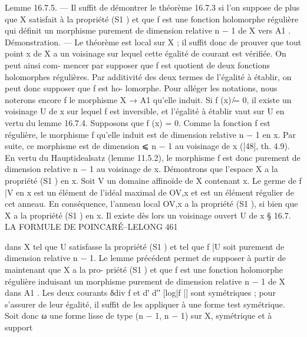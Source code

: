 \documentclass[
  10pt,
]{article}
\newenvironment{Shaded}{}{}
\newcommand{\NormalTok}[1]{#1}
\begin{document}
\begin{Shaded}
\begin{Highlighting}[]
\NormalTok{Lemme 16.7.5. — Il suffit de démontrer le théorème 16.7.3 si l’on suppose de plus que}
\NormalTok{X satisfait à la propriété (S1 ) et que f est une fonction holomorphe régulière qui définit}
\NormalTok{un morphisme purement de dimension relative n − 1 de X vers A1 .}
\NormalTok{Démonstration. — Le théorème est local sur X ; il suffit donc de prouver que tout point x}
\NormalTok{de X a un voisinage sur lequel cette égalité de courant est vérifiée. On peut ainsi com{-}}
\NormalTok{mencer par supposer que f est quotient de deux fonctions holomorphes régulières. Par}
\NormalTok{additivité des deux termes de l’égalité à établir, on peut donc supposer que f est ho{-}}
\NormalTok{lomorphe. Pour alléger les notations, nous noterons encore f le morphisme X → A1}
\NormalTok{qu’elle induit.}
\NormalTok{   Si f (x) ̸= 0, il existe un voisinage U de x sur lequel f est inversible, et l’égalité à}
\NormalTok{établir vaut sur U en vertu du lemme 16.7.4.}
\NormalTok{   Supposons que f (x) = 0. Comme la fonction f est régulière, le morphisme f qu’elle}
\NormalTok{induit est de dimension relative n − 1 en x. Par suite, ce morphisme est de dimension ⩽}
\NormalTok{n − 1 au voisinage de x ([48], th. 4.9). En vertu du Hauptidealsatz (lemme 11.5.2), le}
\NormalTok{morphisme f est donc purement de dimension relative n − 1 au voisinage de x.}
\NormalTok{   Démontrons que l’espace X a la propriété (S1 ) en x. Soit V un domaine affinoïde de X}
\NormalTok{contenant x. Le germe de f |V en x est un élément de l’idéal maximal de OV,x et est un}
\NormalTok{élément régulier de cet anneau. En conséquence, l’anneau local OV,x a la propriété (S1 ),}
\NormalTok{si bien que X a la propriété (S1 ) en x. Il existe dès lors un voisinage ouvert U de x}
\NormalTok{                          § 16.7. LA FORMULE DE POINCARÉ–LELONG                               461}

\NormalTok{dans X tel que U satisfasse la propriété (S1 ) et tel que f |U soit purement de dimension}
\NormalTok{relative n − 1.}
\NormalTok{   Le lemme précédent permet de supposer à partir de maintenant que X a la pro{-}}
\NormalTok{priété (S1 ) et que f est une fonction holomorphe régulière induisant un morphisme}
\NormalTok{purement de dimension relative n − 1 de X dans A1 .}
\NormalTok{   Les deux courants δdiv f et d′ d′′ [log|f |] sont symétriques ; pour s’assurer de leur égalité,}
\NormalTok{il suffit de les appliquer à une forme test symétrique.}
\NormalTok{   Soit donc ω une forme lisse de type (n − 1, n − 1) sur X, symétrique et à support}
\end{Highlighting}
\end{Shaded}
\end{document}
